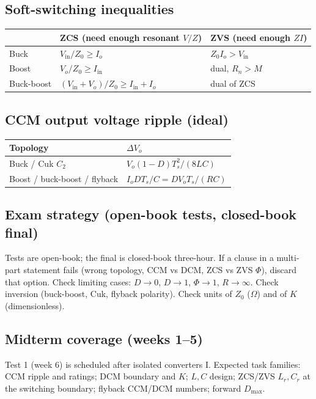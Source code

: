\subsection{Soft-switching inequalities}
\begin{center}
\begin{tabular}{@{}lll@{}}
\toprule
 & ZCS (need enough resonant \(V/Z\)) & ZVS (need enough \(ZI\))\\
\midrule
Buck & \(V_{\mathrm{in}}/Z_0\ge I_o\) & \(Z_0 I_o>V_{\mathrm{in}}\)\\
Boost & \(V_o/Z_0\ge I_{\mathrm{in}}\) & dual, \(R_n>M\)\\
Buck-boost & \((V_{\mathrm{in}}+V_o)/Z_0\ge I_{\mathrm{in}}+I_o\) & dual of ZCS\\
\bottomrule
\end{tabular}
\end{center}

\subsection{CCM output voltage ripple (ideal)}
\begin{center}
\begin{tabular}{@{}ll@{}}
\toprule
Topology & \(\Delta V_o\)\\
\midrule
Buck / Cuk \(C_2\) & \(V_o(1-D)T_s^2/(8LC)\)\\
Boost / buck-boost / flyback & \(I_o D T_s/C=D V_o T_s/(RC)\)\\
\bottomrule
\end{tabular}
\end{center}

\subsection{Exam strategy (open-book tests, closed-book final)}
Tests are open-book; the final is closed-book three-hour. If a clause in a multi-part statement fails (wrong topology, CCM vs DCM, ZCS vs ZVS \(\Phi\)), discard that option. Check limiting cases: \(D\to 0\), \(D\to 1\), \(\Phi\to 1\), \(R\to\infty\). Check inversion (buck-boost, Cuk, flyback polarity). Check units of \(Z_0\) (\(\Omega\)) and of \(K\) (dimensionless).

\subsection{Midterm coverage (weeks 1--5)}
Test 1 (week 6) is scheduled after isolated converters I. Expected task families: CCM ripple and ratings; DCM boundary and \(K\); \(L,C\) design; ZCS/ZVS \(L_r,C_r\) at the switching boundary; flyback CCM/DCM numbers; forward \(D_{\max}\).
